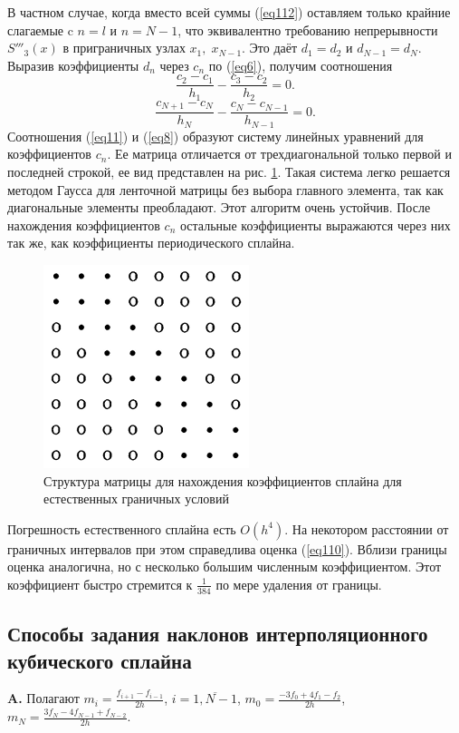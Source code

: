 \documentclass[
11pt,
master, %
subf, %
href, %
colorlinks=true, %
times, %
]{disser}
\begin{document}
В частном случае, когда вместо всей суммы (\ref{eq112}) оставляем только крайние слагаемые c $n = l$ и $n = N - 1$, что эквивалентно требованию непрерывности $S'''_3(x)$ в приграничных узлах $x_1,\;x_{N-1}$. Это даёт $d_1=d_2$ и $d_{N-1}=d_N$. Выразив коэффициенты $d_n$ через $c_n$ по (\ref{eq6}), получим соотношения
\begin{equation}\label{eq11}
  \frac{c_2-c_1}{h_1}-\frac{c_3-c_2}{h_2}=0.
\end{equation}
$$\frac{c_{N+1}-c_N}{h_N}-\frac{c_N-c_{N-1}}{h_{N-1}}=0.$$
Соотношения (\ref{eq11}) и (\ref{eq8}) образуют систему линейных уравнений для коэффициентов $c_n$. Ее матрица отличается от трехдиагональной только первой и последней строкой, ее вид представлен на рис. \ref{ris:2}.
Такая система легко решается методом Гаусса для ленточной матрицы без выбора главного элемента, так как диагональные элементы преобладают. Этот алгоритм очень устойчив. После нахождения коэффициентов $c_n$ остальные коэффициенты выражаются через них так же, как коэффициенты периодического сплайна.
\begin{figure}[h]
  \centering
  \includegraphics{Matrix2.png}
  \caption{Структура матрицы для нахождения коэффициентов сплайна для естественных граничных условий}
  \label{ris:2}
\end{figure}
Погрешность естественного сплайна есть $O(h^4)$. На некотором расстоянии от граничных интервалов при этом справедлива оценка (\ref{eq110}). Вблизи границы оценка аналогична, но с несколько большим численным коэффициентом. Этот коэффициент быстро стремится к $\frac{1}{384}$ по мере удаления от границы.

\subsection{Способы задания наклонов интерполяционного кубического сплайна}
\textbf{A.} Полагают $m_i=\frac{f_{i+1}-f_{i-1}}{2h}$, $i=\overline{1,N-1}$,
  $m_0=\frac{-3f_0+4f_1-f_2}{2h}$, $m_N=\frac{3f_N-4f_{N-1}+f_{N-2}}{2h}$.
\end{document}
